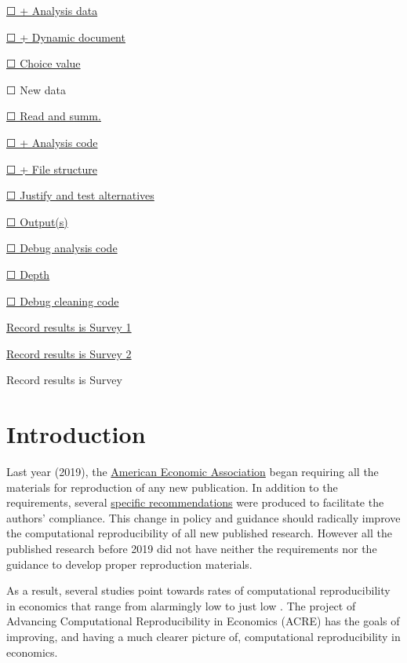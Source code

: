 \documentclass[]{book}
\begin{document}
\protect\hyperlink{ad}{☐ + Analysis data}

\protect\hyperlink{paper-level}{☐ + Dynamic document}

\protect\hyperlink{id-val}{☐ Choice value}

☐ New data

\protect\hyperlink{read-summ}{☐ Read and summ.}

\protect\hyperlink{ac}{☐ + Analysis code}

\protect\hyperlink{paper-level}{☐ + File structure}

\protect\hyperlink{test-rob}{☐ Justify and test alternatives}

\protect\hyperlink{outputs}{☐ Output(s)}

\protect\hyperlink{dac}{☐ Debug analysis code}

\protect\hyperlink{intensive}{☐ Depth}

\protect\hyperlink{dcc}{☐ Debug cleaning code}

\href{https://berkeley.qualtrics.com/jfe/form/SV_3UWe5xu3qjeh0c5}{Record results is Survey 1}

\href{https://berkeley.qualtrics.com/jfe/form/SV_2gd9Y3XVtjLpZL7}{Record results is Survey 2}

Record results is Survey

\hypertarget{intro}{%
\chapter{Introduction}\label{intro}}

Last year (2019), the \href{https://www.aeaweb.org/journals/policies/data-code/}{American Economic Association} began requiring all the materials for reproduction of any new publication. In addition to the requirements, several \href{https://aeadataeditor.github.io/aea-de-guidance/}{specific recommendations} were produced to facilitate the authors' compliance. This change in policy and guidance should radically improve the computational reproducibility of all new published research. However all the published research before 2019 did not have neither the requirements nor the guidance to develop proper reproduction materials.

As a result, several studies point towards rates of computational reproducibility in economics that range from alarmingly low \citep{galiani2018make, chang2015economics} to just low \citep{kingi2018reproducibility}. The project of Advancing Computational Reproducibility in Economics (ACRE) has the goals of improving, and having a much clearer picture of, computational reproducibility in economics.
\end{document}
